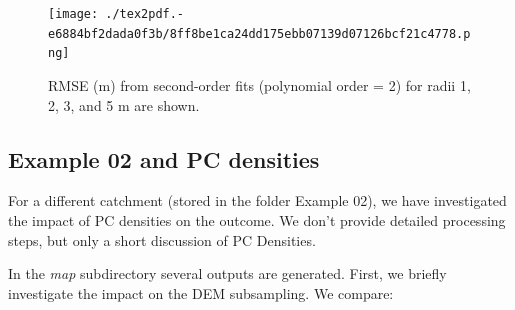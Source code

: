 \documentclass[a4paperpaper,,tablecaptionabove]{scrartcl}
\begin{document}
\begin{figure}
\centering
\texttt{[image: ./tex2pdf.-e6884bf2dada0f3b/8ff8be1ca24dd175ebb07139d07126bcf21c4778.png]}
\caption{RMSE (m) from second-order fits (polynomial order = 2) for
radii 1, 2, 3, and 5 m are shown.
\label{Fig:lasground_RMSE_P2_1_2_3_5m}}
\end{figure}

\hypertarget{example-02-and-pc-densities}{%
\subsection{Example 02 and PC
densities}\label{example-02-and-pc-densities}}

For a different catchment (stored in the folder Example 02), we have
investigated the impact of PC densities on the outcome. We don't provide
detailed processing steps, but only a short discussion of PC Densities.

In the \emph{map} subdirectory several outputs are generated. First, we
briefly investigate the impact on the DEM subsampling. We compare:
\end{document}
